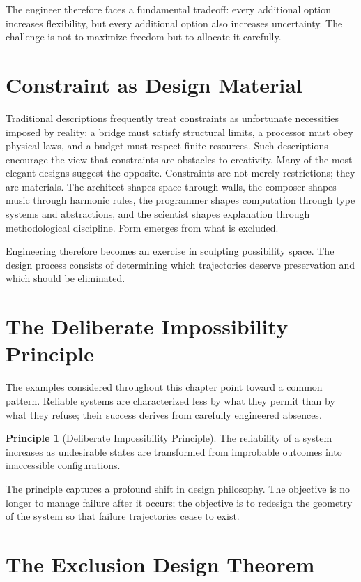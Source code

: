 \documentclass[11pt,oneside]{book}
\theoremstyle{plain}
\theoremstyle{definition}
\newtheorem{principle}[theorem]{Principle}
\theoremstyle{remark}
\begin{document}
The engineer therefore faces a fundamental tradeoff: every additional option increases flexibility, but every additional option also increases uncertainty. The challenge is not to maximize freedom but to allocate it carefully.

\section{Constraint as Design Material}

Traditional descriptions frequently treat constraints as unfortunate necessities imposed by reality: a bridge must satisfy structural limits, a processor must obey physical laws, and a budget must respect finite resources. Such descriptions encourage the view that constraints are obstacles to creativity. Many of the most elegant designs suggest the opposite. Constraints are not merely restrictions; they are materials. The architect shapes space through walls, the composer shapes music through harmonic rules, the programmer shapes computation through type systems and abstractions, and the scientist shapes explanation through methodological discipline. Form emerges from what is excluded.

Engineering therefore becomes an exercise in sculpting possibility space. The design process consists of determining which trajectories deserve preservation and which should be eliminated.

\section{The Deliberate Impossibility Principle}

The examples considered throughout this chapter point toward a common pattern. Reliable systems are characterized less by what they permit than by what they refuse; their success derives from carefully engineered absences.

\begin{principle}[Deliberate Impossibility Principle]
The reliability of a system increases as undesirable states are transformed from improbable outcomes into inaccessible configurations.
\end{principle}

The principle captures a profound shift in design philosophy. The objective is no longer to manage failure after it occurs; the objective is to redesign the geometry of the system so that failure trajectories cease to exist.

\section{The Exclusion Design Theorem}
\end{document}
